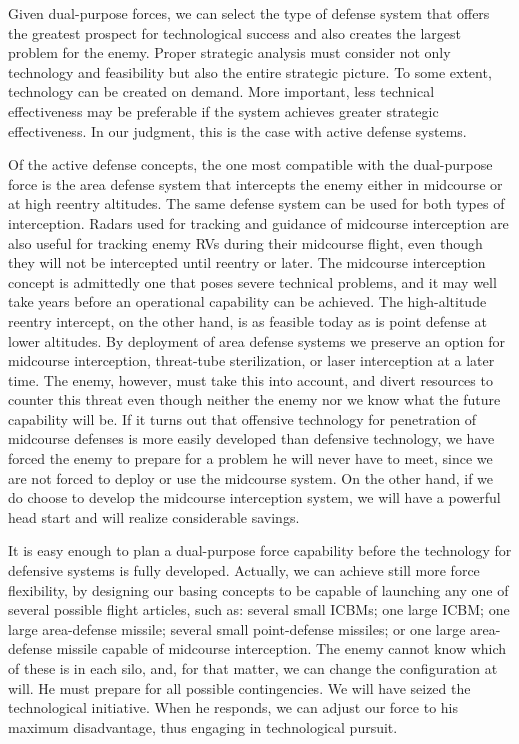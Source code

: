 Given dual-purpose forces, we can select the type of defense system that offers the greatest prospect for technological success and also creates the largest problem for the enemy. Proper strategic analysis must consider not only technology and feasibility but also the entire strategic picture. To some extent, technology can be created on demand. More important, less technical effectiveness may be preferable if the system achieves greater strategic effectiveness. In our judgment, this is the case with active defense systems.

Of the active defense concepts, the one most compatible with the dual-purpose force is the area defense system that intercepts the enemy either in midcourse or at high reentry altitudes. The same defense system can be used for both types of interception. Radars used for tracking and guidance of midcourse interception are also useful for tracking enemy RVs during their midcourse flight, even though they will not be intercepted until reentry or later. The midcourse interception concept is admittedly one that poses severe technical problems, and it may well take years before an operational capability can be achieved. The high-altitude reentry intercept, on the other hand, is as feasible today as is point defense at lower altitudes. By deployment of area defense systems we preserve an option for midcourse interception, threat-tube sterilization, or laser interception at a later time. The enemy, however, must take this into account, and divert resources to counter this threat even though neither the enemy nor we know what the future capability will be. If it turns out that offensive technology for penetration of midcourse defenses is more easily developed than defensive technology, we have forced the enemy to prepare for a problem he will never have to meet, since we are not forced to deploy or use the midcourse system. On the other hand, if we do choose to develop the midcourse interception system, we will have a powerful head start and will realize considerable savings.

It is easy enough to plan a dual-purpose force capability before the technology for defensive systems is fully developed. Actually, we can achieve still more force flexibility, by designing our basing concepts to be capable of launching any one of several possible flight articles, such as: several small ICBMs; one large ICBM; one large area-defense missile; several small point-defense missiles; or one large area-defense missile capable of midcourse interception. The enemy cannot know which of these is in each silo, and, for that matter, we can change the configuration at will. He must prepare for all possible contingencies. We will have seized the technological initiative. When he responds, we can adjust our force to his maximum disadvantage, thus engaging in technological pursuit.

